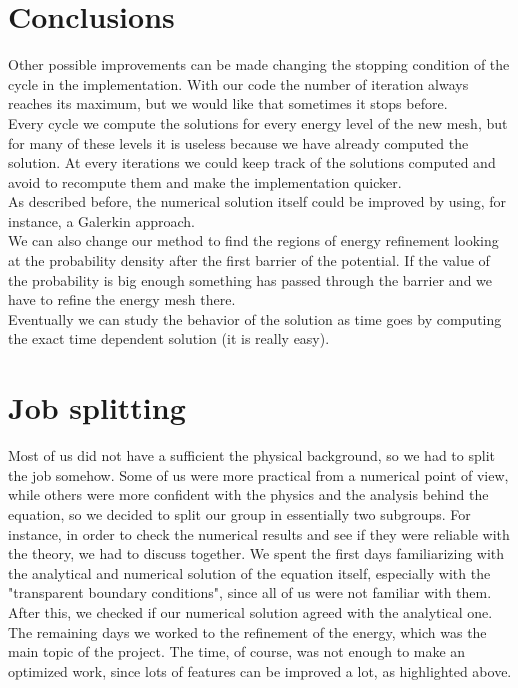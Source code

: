 \documentclass[12pt,a4paper,onecolumn]{article}
\theoremstyle{definition}
\theoremstyle{plain}
\begin{document}
\section{Conclusions}

Other possible improvements can be made changing the stopping condition of the cycle in the implementation. With our code the number of iteration always reaches its maximum, but we would like that sometimes it stops before.\\
Every cycle we compute the solutions for every energy level of the new mesh, but for many of these levels it is useless because we have already computed the solution. At every iterations we could  keep track of the solutions computed and avoid to recompute them and make the implementation quicker.\\
As described before, the numerical solution itself could be improved by using, for instance, a Galerkin approach.\\
We can also change our method to find the regions of energy refinement looking at the probability density after the first barrier of the potential. If the value of the probability is big enough something has passed through the barrier and we have to refine the energy mesh there.\\
Eventually we can study the behavior of the solution as time goes by computing the exact time dependent solution (it is really easy).   


\section{Job splitting}

Most of us did not have a sufficient the physical background, so we had to split the job somehow. Some of us were more practical from a numerical point of view, while others were more confident with the physics and the analysis behind the equation, so we decided to split our group in essentially two subgroups. For instance, in order to check the numerical results and see if they were reliable with the theory, we had to discuss together. We spent the first days familiarizing with the analytical and numerical solution of the equation itself, especially with the "transparent boundary conditions", since all of us were not familiar with them. After this, we checked if our numerical solution agreed with the analytical one. The remaining days we worked to the refinement of the energy, which was the main topic of the project. The time, of course, was not enough to make an optimized work, since lots of features can be improved a lot, as highlighted above.
\end{document}
